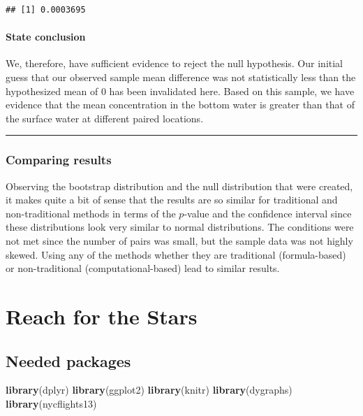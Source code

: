 \documentclass[]{tufte-book}
\newenvironment{Shaded}{\begin{snugshade}}{\end{snugshade}}
\newcommand{\KeywordTok}[1]{\textcolor[rgb]{0.13,0.29,0.53}{\textbf{{#1}}}}
\newcommand{\NormalTok}[1]{{#1}}
\let\oldrule=\rule
\renewcommand{\rule}[1]{\oldrule{\linewidth}}
\begin{document}
\begin{verbatim}
## [1] 0.0003695
\end{verbatim}

\subsubsection{State conclusion}\label{state-conclusion-4}

We, therefore, have sufficient evidence to reject the null hypothesis.
Our initial guess that our observed sample mean difference was not
statistically less than the hypothesized mean of 0 has been invalidated
here. Based on this sample, we have evidence that the mean concentration
in the bottom water is greater than that of the surface water at
different paired locations.

\begin{center}\rule{0.5\linewidth}{\linethickness}\end{center}

\subsection{Comparing results}\label{comparing-results-4}

Observing the bootstrap distribution and the null distribution that were
created, it makes quite a bit of sense that the results are so similar
for traditional and non-traditional methods in terms of the \(p\)-value
and the confidence interval since these distributions look very similar
to normal distributions. The conditions were not met since the number of
pairs was small, but the sample data was not highly skewed. Using any of
the methods whether they are traditional (formula-based) or
non-traditional (computational-based) lead to similar results.

\chapter{Reach for the Stars}\label{appendixC}

\section*{Needed packages}\label{needed-packages-8}

\begin{Shaded}
\begin{Highlighting}[]
\KeywordTok{library}\NormalTok{(dplyr)}
\KeywordTok{library}\NormalTok{(ggplot2)}
\KeywordTok{library}\NormalTok{(knitr)}
\KeywordTok{library}\NormalTok{(dygraphs)}
\KeywordTok{library}\NormalTok{(nycflights13)}
\end{Highlighting}
\end{Shaded}
\end{document}
